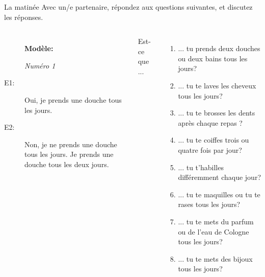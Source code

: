 \documentclass{beamer}
\begin{document}
  \begin{frame}{La matinée}
    \small
    Avec un/e partenaire, répondez aux questions suivantes, et discutez les réponses.
    \begin{columns}
      \scriptsize
        \begin{description}
          \item[] \textbf{Modèle:}
          \item[] \emph{Numéro 1}
          \item[E1:] Oui, je prends une douche tous les jours.
          \item[] 
          \item[E2:] Non, je ne prends une douche tous les jours. Je prends une douche tous les deux jours.
          \item[] 
        \end{description}
        Est-ce que ...
        \begin{enumerate}
          \item ... tu prends deux douches ou deux bains tous les jours?
          \item ... tu te laves les cheveux tous les jours?
          \item ... tu te brosses les dents après chaque repas ?
          \item ... tu te coiffes trois ou quatre fois par jour?
          \item ... tu t'habilles différemment chaque jour?
          \item ... tu te maquilles ou tu te rases tous les jours?
          \item ... tu te mets du parfum ou de l'eau de Cologne tous les jours?
          \item ... tu te mets des bijoux  tous les jours?
        \end{enumerate}
    \end{columns}
  \end{frame}
\end{document}
